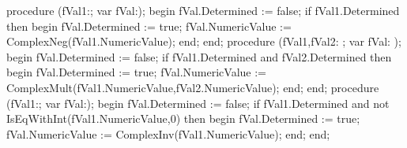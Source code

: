 procedure (fVal1:; var fVal:);
begin
   fVal.Determined := false;
   if fVal1.Determined then
   begin
      fVal.Determined := true;
      fVal.NumericValue := ComplexNeg(fVal1.NumericValue);
   end;
end;
\eatline
{}\nwendcode{}\nwdocspar
\nwenddocs{}\endmoddef\nwstartdeflinemarkup{}\nwenddeflinemarkup
procedure (fVal1,fVal2: ; var fVal: );
begin
   fVal.Determined := false;
   if fVal1.Determined and fVal2.Determined then
   begin
      fVal.Determined := true;
      fVal.NumericValue := ComplexMult(fVal1.NumericValue,fVal2.NumericValue);
   end;
end;
\eatline
{}\nwendcode{}\nwdocspar
\nwenddocs{}\endmoddef\nwstartdeflinemarkup{}\nwenddeflinemarkup
procedure (fVal1:; var fVal:);
begin
   fVal.Determined := false;
   if fVal1.Determined and not IsEqWithInt(fVal1.NumericValue,0) then
   begin
      fVal.Determined := true;
      fVal.NumericValue := ComplexInv(fVal1.NumericValue);
  end;
end;
\eatline
